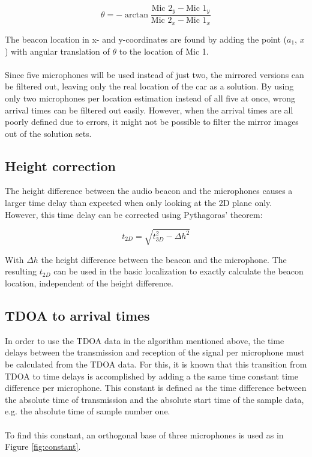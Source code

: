 \documentclass[final]{scrreprt} %
\begin{document}
\begin{equation}
	\theta = -\arctan{\frac{\text{Mic 2}_y - \text{Mic 1}_y}{\text{Mic 2}_x - \text{Mic 1}_x}}
\end{equation}

The beacon location in x- and y-coordinates are found by adding the point ($a_1$, $x$) with angular translation of $\theta$ to the location of Mic 1.
\\ \\
Since five microphones will be used instead of just two, the mirrored versions can be filtered out, leaving only the real location of the car as a solution.
By using only two microphones per location estimation instead of all five at once, wrong arrival times can be filtered out easily.
However, when the arrival times are all poorly defined due to errors, it might not be possible to filter the mirror images out of the solution sets.

\subsection{Height correction}
The height difference between the audio beacon and the microphones causes a larger time delay than expected when only looking at the 2D plane only.
However, this time delay can be corrected using Pythagoras' theorem:

\begin{equation}
	t_{2D} = \sqrt{t_{3D}^2 - \Delta h^2}
\end{equation}

With $\Delta h$ the height difference between the beacon and the microphone.
The resulting $t_{2D}$ can be used in the basic localization to exactly calculate the beacon location, independent of the height difference.

\subsection{TDOA to arrival times}
In order to use the TDOA data in the algorithm mentioned above, the time delays between the transmission and reception of the signal per microphone must be calculated from the TDOA data.
For this, it is known that this transition from TDOA to time delays is accomplished by adding a the same time constant time difference per microphone.
This constant is defined as the time difference between the absolute time of transmission and the absolute start time of the sample data, e.g. the absolute time of sample number one.
\\ \\
To find this constant, an orthogonal base of three microphones is used as in Figure \ref{fig:constant}.
\end{document}
